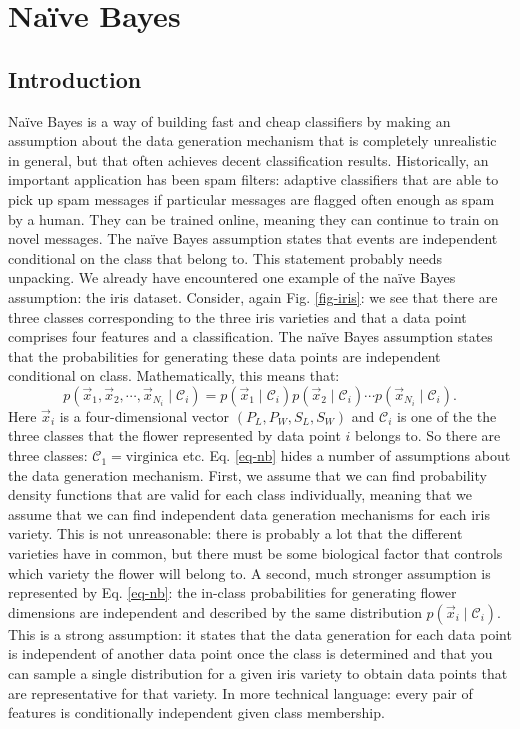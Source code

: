 \chapter{Na\"ive Bayes}
\section{Introduction}
Na\"ive Bayes is a way of building fast and cheap classifiers by making an assumption about the data generation mechanism that is completely unrealistic in general, but that
often achieves decent classification results. Historically, an important application has been spam filters: adaptive classifiers that are able to pick up spam messages if
particular messages are flagged often enough as spam by a human. They can be trained online, meaning they can continue to train on novel messages.
The na\"ive Bayes assumption states that events are independent conditional on the class that belong to. This statement probably needs unpacking. We already have encountered
one example of the na\"ive Bayes assumption: the iris dataset. Consider, again Fig. \ref{fig-iris}: we see that there are three classes corresponding to the three iris
varieties and that a data point comprises four features and a classification. The na\"ive Bayes assumption states that the probabilities for generating these data points
are independent conditional on class. Mathematically, this means that:
\begin{equation}
  p(\vec{x}_1, \vec{x}_2, \cdots, \vec{x}_{N_i} \mid \mathcal{C}_i) = p(\vec{x}_1 \mid \mathcal{C}_i) p( \vec{x}_2 \mid \mathcal{C}_i) \cdots p(\vec{x}_{N_i} \mid \mathcal{C}_i ).
  \label{eq-nb}
\end{equation}
Here $\vec{x}_i$ is a four-dimensional vector $(P_L, P_W, S_L, S_W)$ and $\mathcal{C}_i$ is one of the the three classes that the flower represented by data point $i$
belongs to. So there are three classes: $\mathcal{C}_1 = \mbox{virginica}$ etc. Eq. \ref{eq-nb} hides a number of assumptions about the data generation mechanism.
First, we assume that we can find probability density functions that are valid for each class individually, meaning that we assume that we can find independent data
generation mechanisms for  each iris variety. This is not unreasonable: there is probably a lot that the different varieties have in common, but there must be some biological
factor that controls which variety the flower will belong to. A second, much stronger assumption is represented by Eq. \ref{eq-nb}: the in-class probabilities for generating
flower dimensions are independent and described by the same distribution $p(\vec{x}_i \mid \mathcal{C}_i)$. This is a strong assumption: it states that the data generation
for each data point is independent of another data point once the class is determined and that you can sample a single distribution for a given iris variety to obtain data
points that are representative for that variety. In more technical language: every pair of features is conditionally independent given class membership.

